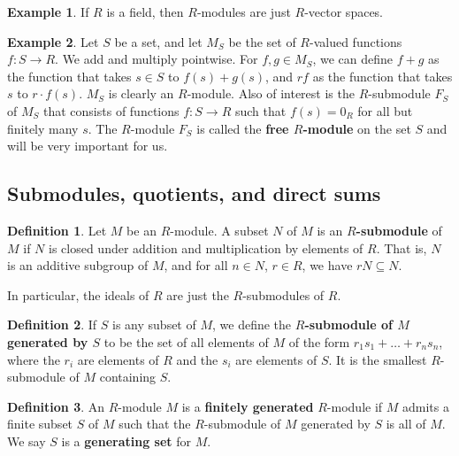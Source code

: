 \documentclass{article}
\newcommand{\rb}[1]{\left( #1 \right)}
\theoremstyle{definition}\newtheorem{definition}{Definition}[subsection]
\theoremstyle{definition}\newtheorem{remark}[definition]{Remark}
\theoremstyle{definition}\newtheorem*{example}{Example}
\theoremstyle{definition}\newtheorem*{note}{Note}
\begin{document}
\begin{example}
If $ R $ is a field, then $ R $-modules are just $ R $-vector spaces.
\end{example}

\begin{example}
Let $ S $ be a set, and let $ M_S $ be the set of $ R $-valued functions $ f : S \to R $. We add and multiply pointwise. For $ f, g \in M_S $, we can define $ f + g $ as the function that takes $ s \in S $ to $ f\rb{s} + g\rb{s} $, and $ rf $ as the function that takes $ s $ to $ r \cdot f\rb{s} $. $ M_S $ is clearly an $ R $-module. Also of interest is the $ R $-submodule $ F_S $ of $ M_S $ that consists of functions $ f : S \to R $ such that $ f\rb{s} = 0_R $ for all but finitely many $ s $. The $ R $-module $ F_S $ is called the \textbf{free $ R $-module} on the set $ S $ and will be very important for us.
\end{example}

\subsection{Submodules, quotients, and direct sums}

\begin{definition}
Let $ M $ be an $ R $-module. A subset $ N $ of $ M $ is an \textbf{$ R $-submodule} of $ M $ if $ N $ is closed under addition and multiplication by elements of $ R $. That is, $ N $ is an additive subgroup of $ M $, and for all $ n \in N $, $ r \in R $, we have $ rN \subseteq N $.
\end{definition}

In particular, the ideals of $ R $ are just the $ R $-submodules of $ R $.

\begin{definition}
If $ S $ is any subset of $ M $, we define the \textbf{$ R $-submodule of $ M $ generated by $ S $} to be the set of all elements of $ M $ of the form $ r_1s_1 + \dots + r_ns_n $, where the $ r_i $ are elements of $ R $ and the $ s_i $ are elements of $ S $. It is the smallest $ R $-submodule of $ M $ containing $ S $.
\end{definition}

\begin{definition}
An $ R $-module $ M $ is a \textbf{finitely generated} $ R $-module if $ M $ admits a finite subset $ S $ of $ M $ such that the $ R $-submodule of $ M $ generated by $ S $ is all of $ M $. We say $ S $ is a \textbf{generating set} for $ M $.
\end{definition}
\end{document}

